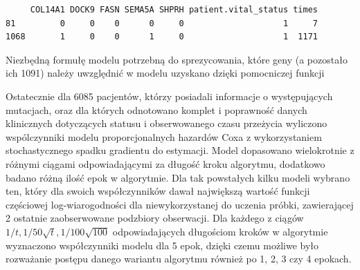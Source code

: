 \begin{verbatim}
     COL14A1 DOCK9 FASN SEMA5A SHPRH patient.vital_status times
81         0     0    0      0     0                    1     7
1068       1     0    0      1     0                    1  1171
\end{verbatim}

Niezbędną formułę modelu potrzebną do sprezycowania, które geny (a
pozostało ich 1091) należy uwzględnić w modelu uzyskano dzięki
pomocniczej funkcji

\begin{Shaded}
\begin{Highlighting}[]
\StringTok{ }
\end{Highlighting}
\end{Shaded}

Ostatecznie dla 6085 pacjentów, którzy posiadali informacje o
występujących mutacjach, oraz dla których odnotowano komplet i
poprawność danych klinicznych dotyczących statusu i obserwowanego czasu
przeżycia wyliczono wspólczynniki modelu proporcjonalnych hazardów Coxa
z wykorzystaniem stochastycznego spadku gradientu do estymacji. Model
dopasowano wielokrotnie z różnymi ciągami odpowiadającymi za długość
kroku algorytmu, dodatkowo badano różną ilość epok w algorytmie. Dla tak
powstałych kilku modeli wybrano ten, który dla swoich współczynników
dawał największą wartość funkcji częściowej log-wiarogodności dla
niewykorzystanej do uczenia próbki, zawierającej 2 ostatnie
zaobserwowane podzbiory obserwacji. Dla każdego z ciągów
\(1/t, 1/50\sqrt{t}, 1/100\sqrt{100}\) odpowiadających długościom
kroków w algorytmie wyznaczono współczynniki modelu dla 5 epok, dzięki
czemu możliwe było rozważanie postępu danego wariantu algorytmu również
po 1, 2, 3 czy 4 epokach.

\begin{Shaded}
\begin{Highlighting}[]
\NormalTok{coxData_split[}\NormalTok{:}\NormalTok{] ->}\StringTok{ }
\NormalTok{coxData_split[}\NormalTok{:}\NormalTok{] ->}\StringTok{ }
  \NormalTok{) ->}\StringTok{ }
  \NormalTok{,}
          \NormalTok{/(}\NormalTok{*}\StringTok{ }
  \NormalTok{,}
          \NormalTok{/(}\NormalTok{*}\StringTok{ }
\end{Highlighting}
\end{Shaded}



